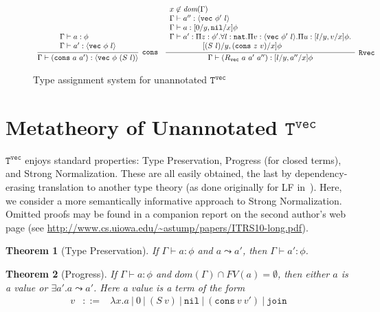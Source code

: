 \documentclass[copyright]{eptcs}
\newtheorem{theorem}{Theorem}
\newcommand{\vc}[0]{\texttt{vec}}
\newcommand{\nat}[0]{\texttt{nat}}
\newcommand{\Tvec}[0]{\texttt{T}^\vc}
\newcommand{\nil}[0]{\texttt{nil}}
\newcommand{\cons}[0]{\texttt{cons}}
\newcommand{\join}[0]{\texttt{join}}
\begin{document}
\begin{figure}
\[\begin{array}{ll}
\infer[\texttt{cons}]{\Gamma\vdash (\cons\ a\ a'):\langle \vc\ \phi\ (S\ l)\rangle}
      {\begin{array}{l}\Gamma\vdash a:\phi \\ \Gamma \vdash a':\langle \vc\ \phi\ l\rangle
       \end{array}}
&
\infer[\texttt{Rvec}]{\Gamma\vdash (R_\vc\ a\ a'\ a''):[l/y, a''/x]\phi}
      {\begin{array}{l}
       x\not\in\textit{dom}(\Gamma) \\
       \Gamma \vdash a'' : \langle \vc\ \phi'\ l\rangle \\
       \Gamma \vdash a : [0/y,\nil/x]\phi \\
       \Gamma \vdash a' : \Pi z:\phi'. \forall l:\nat. \Pi v :\langle \vc\ \phi'\ l\rangle. \Pi u : [l/y, v/x]\phi. \\
        \ \ \ \ \ \ \ \ \ \ \ \ \  [(S\ l)/y, (\cons\ z\ v)/x]\phi
       \end{array}}

\end{array}
\]
\caption{Type assignment system for unannotated $\Tvec$}
\label{fig:typing}
\end{figure}

\section{Metatheory of Unannotated $\Tvec$}
\label{sec:metatheory}

$\Tvec$ enjoys standard properties: Type Preservation, Progress (for
closed terms), and Strong Normalization.  These are all easily
obtained, the last by dependency-erasing translation to another type
theory (as done originally for LF in~\cite{HHP93}).  Here, we consider
a more semantically informative approach to Strong Normalization.
Omitted proofs may be found in a companion report on the second
author's web page (see \url{http://www.cs.uiowa.edu/~astump/papers/ITRS10-long.pdf}).

\begin{theorem}[Type Preservation]
\label{thm:tppres}
If $\Gamma \vdash a : \phi$ and $a\leadsto a'$, then $\Gamma \vdash a':\phi$.
\end{theorem}

\begin{theorem}[Progress]
\label{thm:progress}
If $\Gamma \vdash a : \phi$ and $dom(\Gamma) \cap FV(a) = \emptyset$, then either $a$ is a value or  $\exists a'. a\leadsto a'$. Here a \emph{value} is a term of the form
\[
\begin{array}{lll}
v & ::= & \lambda x.a\ |\ 0\ |\ (S\ v)\ |\ \nil\ |\ (\cons\ v\ v')\ |\ \join
\end{array}
\]
\end{theorem}
\end{document}

